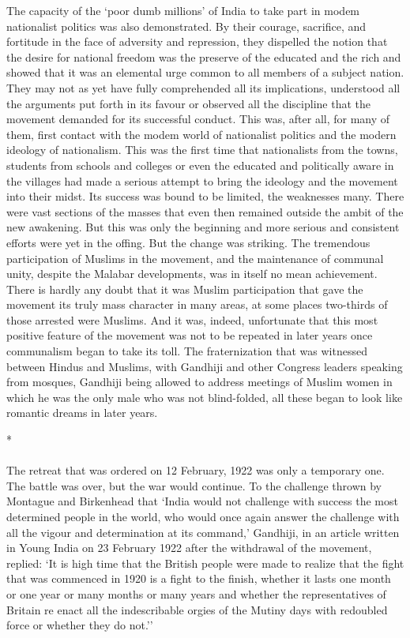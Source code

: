 The capacity of the `poor dumb millions' of India to take part in modem nationalist politics was also demonstrated. By their courage, sacrifice, and fortitude in the face of adversity and repression, they dispelled the notion that the desire for national freedom was the preserve of the educated and the rich and showed that it was an elemental urge common to all members of a subject nation. They may not as yet have fully comprehended all its implications, understood all the arguments put forth in its favour or observed all the discipline that the movement demanded for its successful conduct. This was, after all, for many of them, first contact with the modem world of nationalist politics and the modern ideology of nationalism. This was the first time that nationalists from the towns, students from schools and colleges or even the educated and politically aware in the villages had made a serious attempt to bring the ideology and the movement into their midst. Its success was bound to be limited, the weaknesses many. There were vast sections of the masses that even then remained outside the ambit of the new awakening. But this was only the beginning and more serious and consistent efforts were yet in the offing. But the change was striking. The tremendous participation of Muslims in the movement, and the maintenance of communal unity, despite the Malabar developments, was in itself no mean achievement. There is hardly any doubt that it was Muslim participation that gave the movement its truly mass character in many areas, at some places two-thirds of those arrested were Muslims. And it was, indeed, unfortunate that this most positive feature of the movement was not to be repeated in later years once communalism began to take its toll. The fraternization that was witnessed between Hindus and Muslims, with Gandhiji and other Congress leaders speaking from mosques, Gandhiji being allowed to address meetings of Muslim women in which he was the only male who was not blind-folded, all these began to look like romantic dreams in later years.

\begin{center}*\end{center}

\paragraph*{}


The retreat that was ordered on 12 February, 1922 was only a temporary one. The battle was over, but the war would continue. To the challenge thrown by Montague and Birkenhead that `India would not challenge with success the most determined people in the world, who would once again answer the challenge with all the vigour and determination at its command,' Gandhiji, in an article written in Young India on 23 February 1922 after the withdrawal of the movement, replied: `It is high time that the British people were made to realize that the fight that was commenced in 1920 is a fight to the finish, whether it lasts one month or one year or many months or many years and whether the representatives of Britain re enact all the indescribable orgies of the Mutiny days with redoubled force or whether they do not.''
